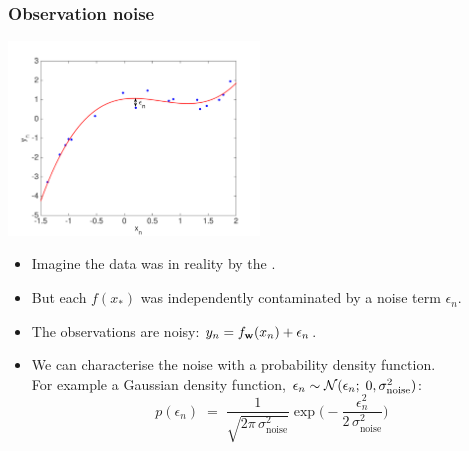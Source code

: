 \begin{frame}
\frametitle{Observation noise}

\centerline{\includegraphics[width=0.5\textwidth]{toy_data_illustrate_Gaussian_noise.pdf}}
\vskip -4mm
\begin{itemize}
\item Imagine the data was in reality  by the .
\item But each $f(x_*)$ was independently contaminated by a noise term $\epsilon_n$.
\item The observations are noisy: $y_n=f_\mathbf w(x_n)+\epsilon_n$.
\item We can characterise the noise with a probability density function.\\ 
For example a Gaussian density function, $\epsilon_n\sim\mathcal{N}(\epsilon_n
; \;0, \sigma_\mathrm{noise}^2)$:
\[
p(\epsilon_n)\;=\;\frac{1}{\sqrt{2\pi\,\sigma_\mathrm{noise}^2}}
\exp{\Big(-\frac{\epsilon_n^2}{2\,\sigma_\mathrm{noise}^2}\Big)}
\]
%
\end{itemize}


\end{frame}
